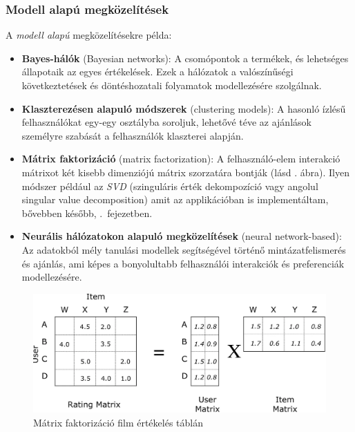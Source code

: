 \documentclass[
]{thesis-ekf}
\theoremstyle{definition}
\theoremstyle{remark}
\begin{document}
\subsubsection{Modell alapú megközelítések}
\label{subsubsec-kollaborativ-modell-alapu-megkozelitesek}
A \emph{modell alapú} megközelítésekre példa:
\begin{itemize}
	\item \textbf{Bayes-hálók} (Bayesian networks): A csomópontok a termékek, és lehetséges állapotaik az egyes  értékelések.\cite{werner-ajanlo-rendszer} Ezek a hálózatok a valószínűségi következtetések és döntéshozatali folyamatok modellezésére szolgálnak.
	\item \textbf{Klaszterezésen alapuló módszerek} (clustering models): A hasonló ízlésű felhasználókat egy-egy osztályba soroljuk, lehetővé téve az ajánlások személyre szabását a felhasználók klaszterei alapján.\cite{werner-ajanlo-rendszer}
	\item \label{kollaborativ-szures-matrix-faktorizació} \textbf{Mátrix faktorizáció} (matrix factorization): A felhasználó-elem interakció mátrixot két kisebb dimenziójú  mátrix szorzatára bontják (lásd . ábra). Ilyen módszer például az \emph{SVD} (szinguláris érték dekompozíció vagy angolul singular value decomposition) amit az applikációban is implementáltam, bővebben később, .~fejezetben.
	\item \textbf{Neurális hálózatokon alapuló megközelítések} (neural network-based): Az adatokból mély tanulási modellek segítségével történő mintázatfelismerés és ajánlás, ami képes a bonyolultabb felhasználói interakciók és preferenciák modellezésére.\cite{journal-neural-collaborative-filtering}
\end{itemize}\cite{wiki-collaborative-filtering}

\begin{figure}[!h]
	\centering
	\includegraphics[width=12cm]{images/matrix-factorization.png}
	\caption[Mátrix faktorizáció film értékelés táblán]{Mátrix faktorizáció film értékelés táblán\footnotemark}
	\label{fig-matrix-factorization}
\end{figure}
\end{document}
